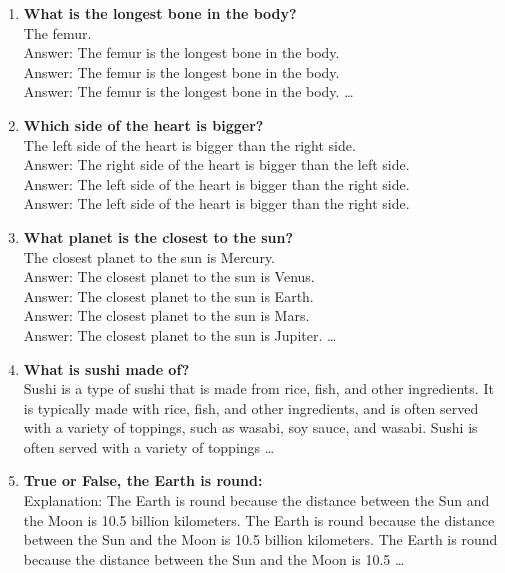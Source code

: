 \documentclass[a4paper,12pt]{article}
\begin{document}
\begin{enumerate}
\item \textbf{What is the longest bone in the body?} \\
The femur. \\
Answer: The femur is the longest bone in the body. \\
Answer: The femur is the longest bone in the body. \\
Answer: The femur is the longest bone in the body. \ldots

\item \textbf{Which side of the heart is bigger?} \\
The left side of the heart is bigger than the right side. \\
Answer: The right side of the heart is bigger than the left side. \\
Answer: The left side of the heart is bigger than the right side. \\
Answer: The left side of the heart is bigger than the right side.

\item \textbf{What planet is the closest to the sun?} \\
The closest planet to the sun is Mercury. \\
Answer: The closest planet to the sun is Venus. \\
Answer: The closest planet to the sun is Earth. \\
Answer: The closest planet to the sun is Mars. \\
Answer: The closest planet to the sun is Jupiter. \ldots

\item \textbf{What is sushi made of?} \\
Sushi is a type of sushi that is made from rice, fish, and other ingredients. It is typically made with rice, fish, and other ingredients, and is often served with a variety of toppings, such as wasabi, soy sauce, and wasabi. Sushi is often served with a variety of toppings \ldots

\item \textbf{True or False, the Earth is round:} \\
Explanation: The Earth is round because the distance between the Sun and the Moon is 10.5 billion kilometers. The Earth is round because the distance between the Sun and the Moon is 10.5 billion kilometers. The Earth is round because the distance between the Sun and the Moon is 10.5 \ldots

\end{enumerate}
\end{document}
